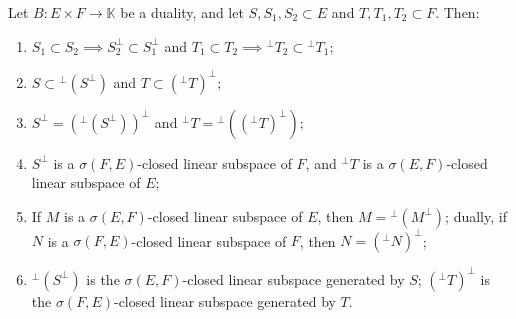 Let $B: E \times F \to \mathbb{K}$ be a duality, and let $S, S_1, S_2 \subset E$ and $T, T_1, T_2 \subset F$. Then:
\begin{enumerate}
\item[(i)] $S_1 \subset S_2 \implies S_2^\perp \subset S_1^\perp$ and $T_1 \subset T_2 \implies {}^\perp T_2 \subset {}^\perp T_1$;
\item[(ii)] $S \subset {}^\perp(S^\perp)$ and $T \subset ({}^\perp T)^\perp$;
\item[(iii)] $S^\perp = ({}^\perp(S^\perp))^\perp$ and ${}^\perp T = {}^\perp(({}^\perp T)^\perp)$;
\item[(iv)] $S^\perp$ is a $\sigma(F,E)$-closed linear subspace of $F$, and ${}^\perp T$ is a $\sigma(E,F)$-closed linear subspace of $E$;
\item[(v)] If $M$ is a $\sigma(E,F)$-closed linear subspace of $E$, then $M = {}^\perp(M^\perp)$; dually, if $N$ is a $\sigma(F,E)$-closed linear subspace of $F$, then $N = ({}^\perp N)^\perp$;
\item[(vi)] ${}^\perp(S^\perp)$ is the $\sigma(E,F)$-closed linear subspace generated by $S$; $(^\perp T)^\perp$ is the $\sigma(F,E)$-closed linear subspace generated by $T$.
\end{enumerate}
